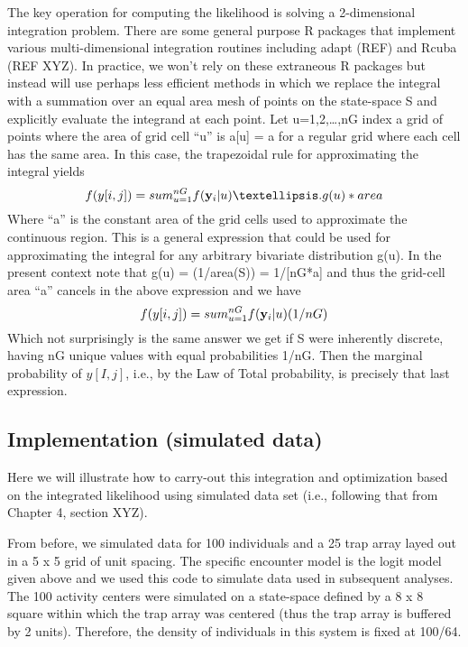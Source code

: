 The key operation for computing the likelihood is solving a
2-dimensional integration problem. There are some general purpose R
packages that implement various multi-dimensional integration routines
including adapt (REF) and Rcuba (REF XYZ). In practice, we won’t rely
on these extraneous R packages but instead will use perhaps less
efficient methods in which we replace the integral with a summation
over an equal area mesh of points on the state-space S and explicitly
evaluate the integrand at each point. Let u=1,2,…,nG index a grid of
points where the area of grid cell “u” is a[u] = a for a regular grid
where each cell has the same area.  In this case, the trapezoidal rule
for approximating the integral yields
\[
          f(y[i,j]) = sum_{u=1}^{nG}  f( {\bold y}_{i} |u) …. g(u) *area
\]
Where “a” is the constant area of the grid cells used to approximate
the continuous region. This is a general expression that could be used
for approximating the integral for any arbitrary bivariate
distribution g(u). In the present context note that g(u) = (1/area(S))
= 1/[nG*a] and thus the grid-cell area “a” cancels in the above
expression and we have
\[
          f(y[i,j]) = sum_{u=1}^{nG}  f( {\bold y}_{i} |u) (1/nG)
\]
Which not surprisingly is the same answer we get if S were inherently
discrete, having nG unique values with equal probabilities 1/nG. Then
the marginal probability of $y[I,j]$, i.e., by the Law of Total
probability, is precisely that last expression.

\subsection{ Implementation (simulated data)}

Here we will illustrate how to carry-out this integration and
optimization based on the integrated likelihood using simulated data
set (i.e., following that from Chapter 4, section XYZ).

From before, we simulated data for 100 individuals and a 25 trap array
layed out in a 5 x 5 grid of unit spacing.  The specific encounter
model is the logit model given above and we used this code to simulate
data used in subsequent analyses.  The 100 activity centers were
simulated on a state-space defined by a 8 x 8 square within which the
trap array was centered (thus the trap array is buffered by 2
units). Therefore, the density of individuals in this system is fixed
at 100/64.

